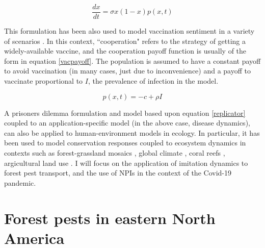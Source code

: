 \begin{equation}
    \frac{dx}{dt} = \sigma x(1 - x)p(x,t) 
    \label{replicator}
\end{equation}


This formulation has been also used to model vaccination sentiment in a variety of scenarios \cite{oraby2014influence,bauch2004vaccination,bauch2005imitation,bauch2012evolutionary}. In this context, ``cooperation" refers to the strategy of getting a widely-available vaccine, and the cooperation payoff function is usually of the form in equation \ref{vacpayoff}. The population is assumed to have a constant payoff to avoid vaccination (in many cases, just due to inconvenience) and a payoff to vaccinate proportional to $I$, the prevalence of infection in the model. 

\begin{equation}
    p(x,t) = - c + \rho I
    \label{vacpayoff}
\end{equation}


A prisoners dilemma formulation and model based upon equation \ref{replicator} coupled to an application-specific model (in the above case, disease dynamics), can also be applied to human-environment models in ecology. In particular, it has been used to model conservation responses coupled to ecosystem dynamics in contexts such as forest-grassland mosaics \cite{innes2013impact,henderson2016alternative}, global climate \cite{bury2019charting}, coral reefs \cite{thampi2018socio}, argicultural land use \cite{gooding2018forest}. I will focus on the application of imitation dynamics to forest pest transport, and the use of NPIs in the context of the Covid-19 pandemic.


\section{Forest pests in eastern North America}

